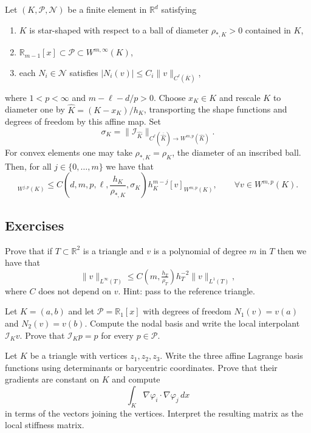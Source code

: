 \begin{strongtheorem}
    \label{thm:FEM bound interpolation error}
    Let $(K, \mathcal P, \mathcal N)$ be a finite element in $\mathbb R^d$ satisfying
    \begin{enumerate}
        \item $K$ is star-shaped with respect to a ball of diameter $\rho_{*,K}>0$ contained in $K$,
        \item $\mathbb R_{m-1}[x] \subset \mathcal P \subset W^{m,\infty} (K)$,
        \item each $N_i \in \mathcal N $ satisfies $|N_i(v)| \le C_i \| v \|_{C^\ell(\overline K)}$,
    \end{enumerate}
    where $1<p<\infty$ and $m-\ell-d/p>0$. Choose $x_K\in K$ and rescale $K$ to diameter one by $\widehat K=(K-x_K)/h_K$, transporting the shape functions and degrees of freedom by this affine map. Set
    \begin{equation*}
        \sigma_K=\|\mathcal I_{\widehat K}\|_{C^\ell(\overline{\widehat K})\to W^{m,p}(\widehat K)}.
    \end{equation*}
    For convex elements one may take $\rho_{*,K}=\rho_K$, the diameter of an inscribed ball. Then, for all $j \in \{0, \dots, m\}$ we have that
    \begin{equation*}
        [v - \mathcal I_K v ]_{W^{j,p} (K)} \le C\left(d,m,p,\ell,\frac{h_K}{\rho_{*,K}},\sigma_K\right) h_K^{m-j} [v]_{W^{m,p}(K)}, \qquad \forall v \in W^{m,p}(K).
    \end{equation*}
\end{strongtheorem}

\subsection*{Exercises}
\begin{exercises}
    \ex Prove that if $T \subset \mathbb R^2$ is a triangle and $v$ is a polynomial of degree $m$ in $T$ then we have that
    \[
        \|v\|_{L^\infty (T)} \le C(m,\tfrac{h_T}{\rho_T}) h_T^{-2} \|v\|_{L^1 (T)},
    \]
    where $C$ does not depend on $v$. Hint: pass to the reference triangle.

    \ex Let $K=(a,b)$ and let $\mathcal P=\mathbb R_1[x]$ with degrees of freedom
    $N_1(v)=v(a)$ and $N_2(v)=v(b)$. Compute the nodal basis and write the
    local interpolant $\mathcal I_Kv$. Prove that $\mathcal I_Kp=p$ for every
    $p\in\mathcal P$.

    \ex Let $K$ be a triangle with vertices $z_1,z_2,z_3$. Write the three
    affine Lagrange basis functions using determinants or barycentric
    coordinates. Prove that their gradients are constant on $K$ and compute
    \[
        \int_K \nabla\varphi_i\cdot\nabla\varphi_j\,dx
    \]
    in terms of the vectors joining the vertices. Interpret the resulting
    matrix as the local stiffness matrix.
\end{exercises}


